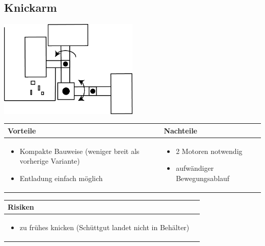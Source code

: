 \pagebreak


\subsection{Knickarm}

\includegraphics[width=0.5\textwidth]{fig/Beladen_2.png}

\begin{table}[h]
\begin{tabular}{p{} | p{}}


 \textbf{Vorteile} & \textbf{Nachteile} \\ \hline
	 
\begin{itemize}
\item Kompakte Bauweise (weniger breit als vorherige Variante)
\item Entladung einfach möglich 
\end{itemize}

 
 &
 
\begin{itemize}
\item 2 Motoren notwendig
\item aufwändiger Bewegungsablauf
\end{itemize}

\end{tabular}
\end{table}

\begin{table}[h]
\begin{tabular}{p{}p{}}


 \textbf{Risiken} & \\ \hline
	 
\begin{itemize}
\item zu frühes knicken (Schüttgut landet nicht in Behälter) 
\end{itemize}
 
\end{tabular}
\end{table}

\pagebreak